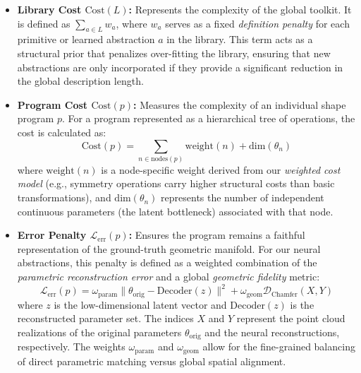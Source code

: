 \documentclass{thesis}
\begin{document}
\begin{itemize}
    \item \textbf{Library Cost $\text{Cost}(L)$:} Represents the complexity of the global toolkit. It is defined as $\sum_{a \in L} w_a$, where $w_a$ serves as a fixed \textit{definition penalty} for each primitive or learned abstraction $a$ in the library. This term acts as a structural prior that penalizes over-fitting the library, ensuring that new abstractions are only incorporated if they provide a significant reduction in the global description length.
    
    \item \textbf{Program Cost $\text{Cost}(p)$:} Measures the complexity of an individual shape program $p$. For a program represented as a hierarchical tree of operations, the cost is calculated as:
    \begin{equation}
        \text{Cost}(p) = \sum_{n \in \text{nodes}(p)} \text{weight}(n) + \text{dim}(\theta_n)
    \end{equation}
    where $\text{weight}(n)$ is a node-specific weight derived from our \textit{weighted cost model} (e.g., symmetry operations carry higher structural costs than basic transformations), and $\text{dim}(\theta_n)$ represents the number of independent continuous parameters (the latent bottleneck) associated with that node.
    
    \item \textbf{Error Penalty $\mathcal{L}_{\text{err}}(p)$:} Ensures the program remains a faithful representation of the ground-truth geometric manifold. For our neural abstractions, this penalty is defined as a weighted combination of the \textit{parametric reconstruction error} and a global \textit{geometric fidelity} metric:
    \begin{equation}
        \mathcal{L}_{\text{err}}(p) = \omega_{\text{param}} \| \theta_{\text{orig}} - \text{Decoder}(z) \|^2 + \omega_{\text{geom}} \mathcal{D}_{\text{Chamfer}}(X, Y)
    \end{equation}
    where $z$ is the low-dimensional latent vector and $\text{Decoder}(z)$ is the reconstructed parameter set. The indices $X$ and $Y$ represent the point cloud realizations of the original parameters $\theta_{\text{orig}}$ and the neural reconstructions, respectively. The weights $\omega_{\text{param}}$ and $\omega_{\text{geom}}$ allow for the fine-grained balancing of direct parametric matching versus global spatial alignment.
\end{itemize}
\end{document}
